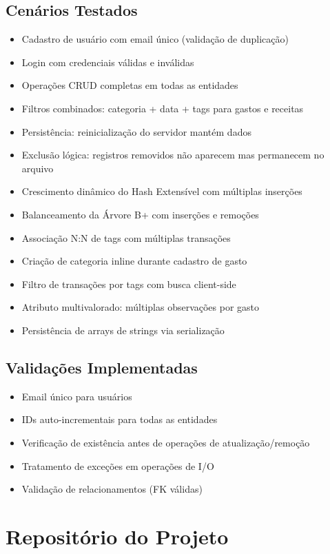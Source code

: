 \documentclass[12pt,a4paper]{article}
\begin{document}
\subsection*{Cenários Testados}
\begin{itemize}
  \item Cadastro de usuário com email único (validação de duplicação)
  \item Login com credenciais válidas e inválidas
  \item Operações CRUD completas em todas as entidades
  \item Filtros combinados: categoria + data + tags para gastos e receitas
  \item Persistência: reinicialização do servidor mantém dados
  \item Exclusão lógica: registros removidos não aparecem mas permanecem no arquivo
  \item Crescimento dinâmico do Hash Extensível com múltiplas inserções
  \item Balanceamento da Árvore B+ com inserções e remoções
  \item Associação N:N de tags com múltiplas transações
  \item Criação de categoria inline durante cadastro de gasto
  \item Filtro de transações por tags com busca client-side
  \item Atributo multivalorado: múltiplas observações por gasto
  \item Persistência de arrays de strings via serialização
\end{itemize}

\subsection*{Validações Implementadas}
\begin{itemize}
  \item Email único para usuários
  \item IDs auto-incrementais para todas as entidades
  \item Verificação de existência antes de operações de atualização/remoção
  \item Tratamento de exceções em operações de I/O
  \item Validação de relacionamentos (FK válidas)
\end{itemize}

\section{Repositório do Projeto}
\end{document}
